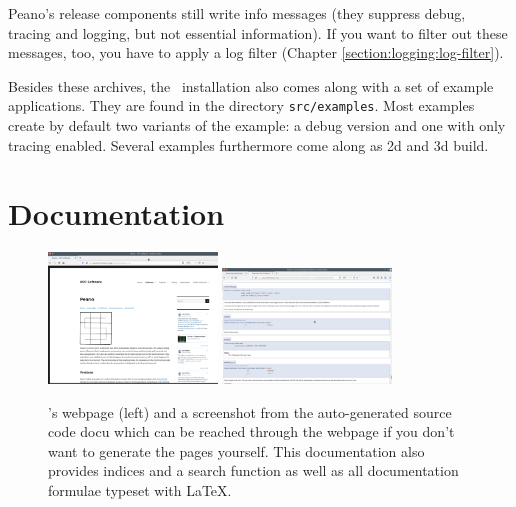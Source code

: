\begin{remark}
 Peano's release components still write info messages (they suppress debug,
 tracing and logging, but not essential information). If you want to filter out
 these messages, too, you have to apply a log filter (Chapter
 \ref{section:logging:log-filter}).
\end{remark}


\noindent
Besides these archives, the \Peano\ installation also comes along with a set of
example applications.
They are found in the directory \texttt{src/examples}.
Most examples create by default two variants of the example: a debug
version and one with only tracing enabled.
Several examples furthermore come along as 2d and 3d build.



\section{Documentation}

\begin{figure}
 \begin{center}
  \includegraphics[width=0.4\textwidth]{10_installation/webpage.png}
  \hspace{0.4cm}
  \includegraphics[width=0.4\textwidth]{10_installation/source-docu.png}
 \end{center}
 \caption{
  \Peano's webpage (left) and a screenshot from the auto-generated source code
  docu which can be reached through the webpage if you don't want to generate
  the pages yourself.
  This documentation also provides indices and a search function as well as all
  documentation formulae typeset with LaTeX.
 }
\end{figure}



